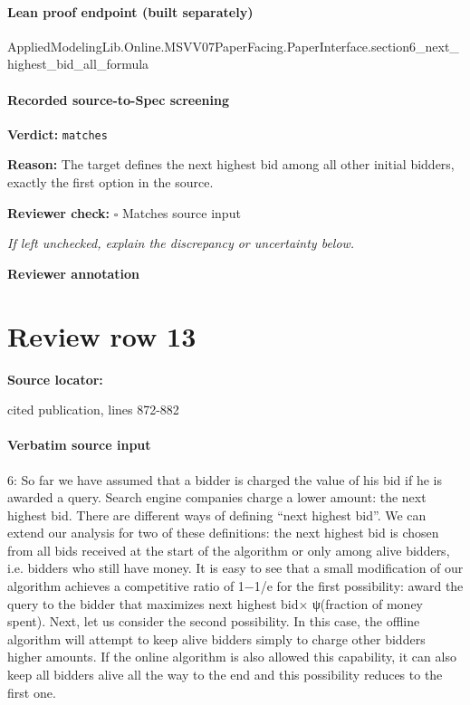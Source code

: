 \documentclass[10pt]{article}
\newcommand{\reviewerbox}{%
  \par\noindent\fbox{\parbox{0.96\linewidth}{\rule{0pt}{0.38in}}}\par
}
\newcommand{\reviewmatch}[1]{%
  \par\noindent\textbf{Reviewer check:} $\square$\; #1\par
  \noindent\emph{If left unchecked, explain the discrepancy or uncertainty below.}\par
}
\begin{document}
\paragraph{Lean proof endpoint (built separately)}\begin{ReviewVerbatim}
AppliedModelingLib.Online.MSVV07PaperFacing.PaperInterface.section6_next_highest_bid_all_formula
\end{ReviewVerbatim}

\paragraph{Recorded source-to-Spec screening}
\textbf{Verdict:} \texttt{matches}
\\
{\raggedright
\textbf{Reason:} The target defines the next highest bid among all other initial bidders, exactly the first option in the source.\allowbreak{}
\par}
\reviewmatch{Matches source input}
\noindent\textbf{Reviewer annotation}\par
\reviewerbox
\clearpage
\hypertarget{source-claim-e228272600f768f5}{}
\section*{Review row 13}
\textbf{Source locator:} {\footnotesize\raggedright cited publication, lines 872-\allowbreak{}882\par}
\paragraph{Verbatim source input}
\begin{ReviewVerbatim}
6: So far we have assumed that a bidder is charged the value of his bid if he is awarded a query.
Search engine companies charge a lower amount: the next highest bid. There are different ways
of defining “next highest bid”. We can extend our analysis for two of these definitions: the
next highest bid is chosen from all bids received at the start of the algorithm or only among
alive bidders, i.e. bidders who still have money.
It is easy to see that a small modification of our algorithm achieves a competitive ratio of
1−1/e for the first possibility: award the query to the bidder that maximizes next highest bid×
ψ(fraction of money spent). Next, let us consider the second possibility. In this case, the offline
algorithm will attempt to keep alive bidders simply to charge other bidders higher amounts.
If the online algorithm is also allowed this capability, it can also keep all bidders alive all the
way to the end and this possibility reduces to the first one.
\end{ReviewVerbatim}
\end{document}
